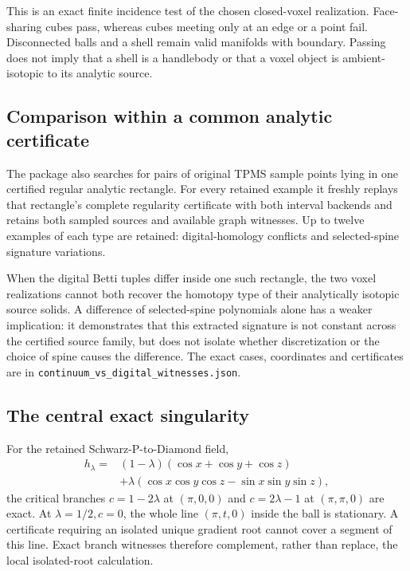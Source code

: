 \documentclass[10pt,a4paper]{article}
\begin{document}
\begin{center}\end{center}

This is an exact finite incidence test of the chosen closed-voxel realization. Face-sharing cubes pass, whereas cubes meeting only at an edge or a point fail. Disconnected balls and a shell remain valid manifolds with boundary. Passing does not imply that a shell is a handlebody or that a voxel object is ambient-isotopic to its analytic source.

\subsection*{Comparison within a common analytic certificate}
The package also searches for pairs of original TPMS sample points lying in one certified regular analytic rectangle. For every retained example it freshly replays that rectangle's complete regularity certificate with both interval backends and retains both sampled sources and available graph witnesses. Up to twelve examples of each type are retained: \HomologyConflicts{} digital-homology conflicts and \SignatureVariations{} selected-spine signature variations.

When the digital Betti tuples differ inside one such rectangle, the two voxel realizations cannot both recover the homotopy type of their analytically isotopic source solids. A difference of selected-spine polynomials alone has a weaker implication: it demonstrates that this extracted signature is not constant across the certified source family, but does not isolate whether discretization or the choice of spine causes the difference. The exact cases, coordinates and certificates are in \texttt{continuum\_vs\_digital\_witnesses.json}.

\subsection*{The central exact singularity}
For the retained Schwarz-P-to-Diamond field,
\begin{align}
h_\lambda={}&(1-\lambda)(\cos x+\cos y+\cos z)\nonumber\\
&+\lambda(\cos x\cos y\cos z-\sin x\sin y\sin z),
\end{align}
the critical branches $c=1-2\lambda$ at $(\pi,0,0)$ and $c=2\lambda-1$ at $(\pi,\pi,0)$ are exact. At $\lambda=1/2,c=0$, the whole line $(\pi,t,0)$ inside the ball is stationary. A certificate requiring an isolated unique gradient root cannot cover a segment of this line. Exact branch witnesses therefore complement, rather than replace, the local isolated-root calculation.
\end{document}
